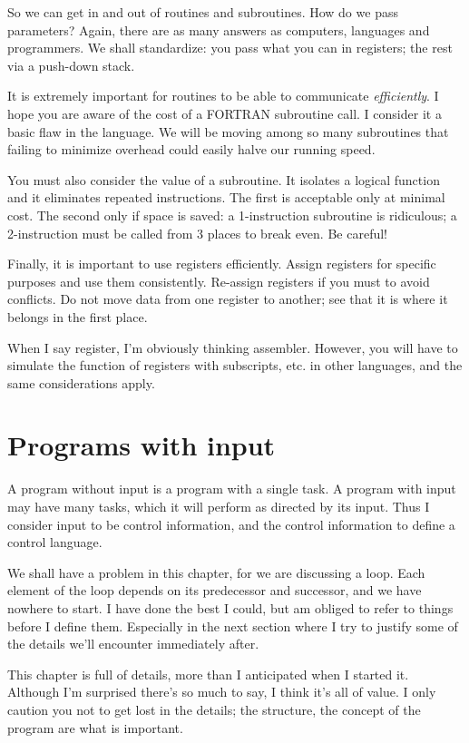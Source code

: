 \documentclass[b5paper, oneside]{book}
\begin{document}
So we can get in and out of routines and subroutines. How do we pass parameters? Again, there are as many answers as computers, languages and programmers. We shall standardize: you pass what you can in registers; the rest via a push-down stack.

It is extremely important for routines to be able to communicate {\em efficiently}. I hope you are aware of the cost of a FORTRAN subroutine call. I consider it a basic flaw in the language. We will be moving among so many subroutines that failing to minimize overhead could easily halve our running speed.

You must also consider the value of a subroutine. It isolates a logical function and it eliminates repeated instructions. The first is acceptable only at minimal cost. The second only if space is saved: a 1-instruction subroutine is ridiculous; a 2-instruction must be called from 3 places to break even. Be careful!

Finally, it is important to use registers efficiently. Assign registers for specific purposes and use them consistently. Re-assign registers if you must to avoid conflicts. Do not move data from one register to another; see that it is where it belongs in the first place.

When I say register, I'm obviously thinking assembler. However, you will have to simulate the function of registers with subscripts, etc. in other languages, and the same considerations apply.



\chapter{Programs with input}
A program without input is a program with a single task. A program with input may have many tasks, which it will perform as directed by its input. Thus I consider input to be control information, and the control information to define a control language.

We shall have a problem in this chapter, for we are discussing a loop. Each element of the loop depends on its predecessor and successor, and we have nowhere to start. I have done the best I could, but am obliged to refer to things before I define them. Especially in the next section where I try to justify some of the details we'll encounter immediately after.

This chapter is full of details, more than I anticipated when I started it. Although I'm surprised there's so much to say, I think it's all of value. I only caution you not to get lost in the details; the structure, the concept of the program are what is important.
\end{document}
